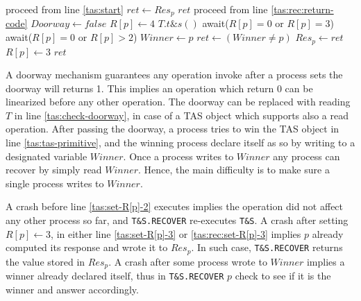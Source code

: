 \begin{algorithm}[b]
\begin{multicols}{2}
\begin{algorithmic}[1]
			 \label{tas:rec:start}
			\State proceed from line \ref{tas:start}
			\EndIf
			 \label{tas:rec:return-operation-done}
			\State $ret \gets Res_p$
			\State \Return $ret$
			\EndIf
			 \label{tas:rec:check-winner}
			\State proceed from line \ref{tas:rec:return-code}
			\EndIf
			\State $Doorway \gets false$ \label{tas:rec:close-doorway}
			\State $R[p] \gets 4$ \label{tas:rec:set-R[p]-4}
			\State $T.t\&s()$ \label{tas:rec:tas-primitive}
			 \label{tas:rec:wait-lower-id}
			\State await($R[p] = 0$ or $R[p] = 3$)
			\EndFor
			 \label{tas:rec:wait-higher-id}
			\State await($R[p] = 0$ or $R[p]>2$)
			\EndFor
			 \label{tas:rec:winner-not-overwrite}
			\State $Winner \gets p$ \label{tas:rec:write-winner}
			\EndIf
			\State $ret \gets (Winner \neq p)$ \label{tas:rec:return-code}
			\State $Res_p \gets ret$
			\State $R[p] \gets 3$ \label{tas:rec:set-R[p]-3}
			\State \Return $ret$
			\EndProcedure
		\end{algorithmic}
	\end{multicols}
\end{algorithm}


A doorway mechanism guarantees any operation invoke after a process sets the doorway will returns 1. This implies an operation which return 0 can be linearized before any other operation. The doorway can be replaced with reading $T$ in line \ref{tas:check-doorway}, in case of a TAS object which supports also a read operation.
After passing the doorway, a process tries to win the TAS object in line \ref{tas:tas-primitive}, and the winning process declare itself as so by writing to a designated variable $Winner$. Once a process writes to $Winner$ any process can recover by simply read $Winner$. Hence, the main difficulty is to make sure a single process writes to $Winner$.

A crash before line \ref{tas:set-R[p]-2} executes implies the operation did not affect any other process so far, and \texttt{T\&S.RECOVER} re-executes \texttt{T\&S}. A crash after setting $R[p] \gets 3$, in either line \ref{tas:set-R[p]-3} or \ref{tas:rec:set-R[p]-3} implies $p$ already computed its response and wrote it to $Res_p$. In such case, \texttt{T\&S.RECOVER} returns the value stored in $Res_p$. A crash after some process wrote to $Winner$ implies a winner already declared itself, thus in \texttt{T\&S.RECOVER} $p$ check to see if it is the winner and answer accordingly.

